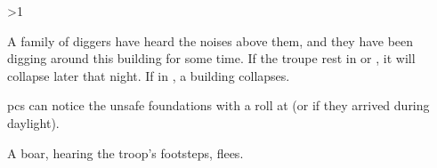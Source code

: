 \ifnum\value{temperature}>1

\mouthdigger


A family of \glspl{digger} have heard the noises above them, and they have been digging around this building for some time.
If the troupe rest in  or , it will collapse later that night.
If in , a building collapses.

\Glspl{pc} can notice the unsafe foundations with a  roll at \tn[12] (or \tn[10] if they arrived during daylight).


\else

\boar


A boar, hearing the troop's footsteps, flees.

\fi

